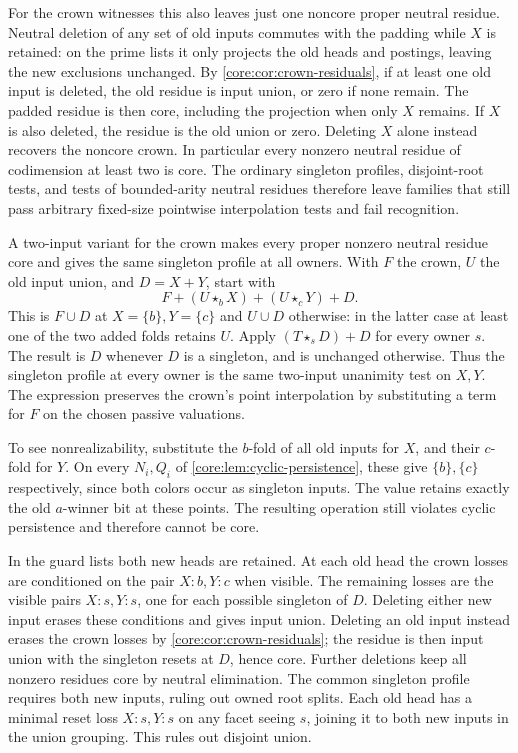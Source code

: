 For the crown witnesses this also leaves just one
noncore proper neutral residue. Neutral deletion of
any set of old inputs commutes with the padding
while $X$ is retained: on the prime lists it only
projects the old heads and postings, leaving the
new exclusions unchanged. By \cref{core:cor:crown-residuals},
if at least one old input is deleted, the old
residue is input union, or zero if none remain.
The padded residue is then core, including the
projection when only $X$ remains. If $X$ is also
deleted, the residue is the old union or zero.
Deleting $X$ alone instead recovers the noncore
crown. In particular every nonzero neutral residue
of codimension at least two is core. The ordinary
singleton profiles, disjoint-root tests, and tests
of bounded-arity neutral residues therefore leave
families that still pass arbitrary fixed-size
pointwise interpolation tests and fail recognition.

A two-input variant for the crown makes every proper
nonzero neutral residue core and gives the same
singleton profile at all owners. With $F$ the crown,
$U$ the old input union, and $D=X+Y$, start with
\[
 F+(U\star_b X)+(U\star_c Y)+D.
\]
This is $F\cup D$ at $X=\{b\},Y=\{c\}$ and
$U\cup D$ otherwise: in the latter case at least
one of the two added folds retains $U$. Apply
$(T\star_s D)+D$ for every owner $s$. The result
is $D$ whenever $D$ is a singleton, and is
unchanged otherwise. Thus the singleton profile
at every owner is the same two-input unanimity
test on $X,Y$. The expression preserves the
crown's point interpolation by substituting a
term for $F$ on the chosen passive valuations.

To see nonrealizability, substitute the $b$-fold
of all old inputs for $X$, and their $c$-fold
for $Y$. On every $N_i,Q_i$ of
\cref{core:lem:cyclic-persistence}, these give
$\{b\},\{c\}$ respectively, since both colors
occur as singleton inputs. The value retains
exactly the old $a$-winner bit at these points.
The resulting operation still violates cyclic
persistence and therefore cannot be core.

In the guard lists both new heads are retained.
At each old head the crown losses are conditioned
on the pair $X:b,Y:c$ when visible. The remaining
losses are the visible pairs $X:s,Y:s$, one for
each possible singleton of $D$. Deleting either
new input erases these conditions and gives input
union. Deleting an old input instead erases the
crown losses by \cref{core:cor:crown-residuals};
the residue is then input union with the singleton
resets at $D$, hence core. Further deletions keep
all nonzero residues core by neutral elimination.
The common singleton profile requires both new
inputs, ruling out owned root splits. Each old
head has a minimal reset loss $X:s,Y:s$ on any
facet seeing $s$, joining it to both new inputs in
the union grouping. This rules out disjoint union.

